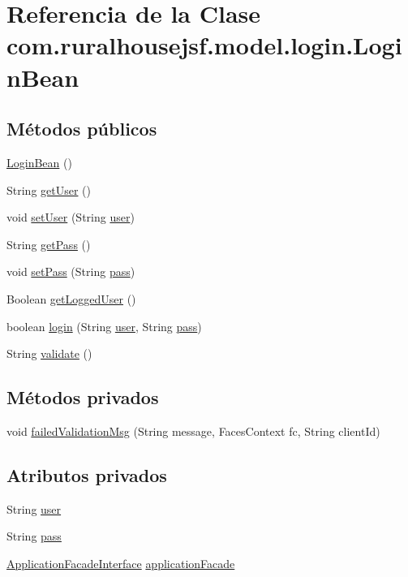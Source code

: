 \hypertarget{a00232}{}\section{Referencia de la Clase com.\+ruralhousejsf.\+model.\+login.\+Login\+Bean}
\label{a00232}
\subsection*{Métodos públicos}
\begin{DoxyCompactItemize}
\item 
\mbox{\hyperlink{a00232_ae77b2f684ab6b7fc6f4fd4274ccd2c84}{Login\+Bean}} ()
\item 
String \mbox{\hyperlink{a00232_ab0769180b1eaf69f94f0aa181fc2dd40}{get\+User}} ()
\item 
void \mbox{\hyperlink{a00232_a87f309a4e8c32ad0246198b72ef45458}{set\+User}} (String \mbox{\hyperlink{a00232_a06e00e34aacd95ab04a33bae5bc50b34}{user}})
\item 
String \mbox{\hyperlink{a00232_ace5538b87e614420da9c6ce31a5c7cef}{get\+Pass}} ()
\item 
void \mbox{\hyperlink{a00232_a5c0db493f5898894994d767564c9b493}{set\+Pass}} (String \mbox{\hyperlink{a00232_a4abf487aa0d370809a4f737dd87dbdd7}{pass}})
\item 
Boolean \mbox{\hyperlink{a00232_acfc1e8aa6bd2b829d5115a5dc7e8d3d6}{get\+Logged\+User}} ()
\item 
boolean \mbox{\hyperlink{a00232_a1d87bc3b800e6c4a0b3986d7671334fd}{login}} (String \mbox{\hyperlink{a00232_a06e00e34aacd95ab04a33bae5bc50b34}{user}}, String \mbox{\hyperlink{a00232_a4abf487aa0d370809a4f737dd87dbdd7}{pass}})
\item 
String \mbox{\hyperlink{a00232_ac3b4153fa4416dc62d107ae2005a9ee8}{validate}} ()
\end{DoxyCompactItemize}
\subsection*{Métodos privados}
\begin{DoxyCompactItemize}
\item 
void \mbox{\hyperlink{a00232_a79fa6a37fba3ce108e71cb637bf899a0}{failed\+Validation\+Msg}} (String message, Faces\+Context fc, String client\+Id)
\end{DoxyCompactItemize}
\subsection*{Atributos privados}
\begin{DoxyCompactItemize}
\item 
String \mbox{\hyperlink{a00232_a06e00e34aacd95ab04a33bae5bc50b34}{user}}
\item 
String \mbox{\hyperlink{a00232_a4abf487aa0d370809a4f737dd87dbdd7}{pass}}
\item 
\mbox{\hyperlink{a00136}{Application\+Facade\+Interface}} \mbox{\hyperlink{a00232_aba818fddb0e4c1e484f5a336e9cedd40}{application\+Facade}}
\end{DoxyCompactItemize}


